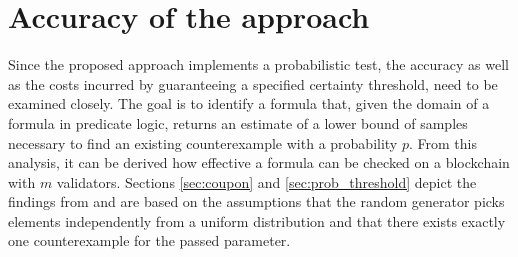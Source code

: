 \section{Accuracy of the approach}\label{sec:accuracy}
Since the proposed approach implements a probabilistic test, the accuracy as well as the costs incurred by guaranteeing a specified certainty threshold, need to be examined closely. The goal is to identify a formula that, given the domain of a formula in predicate logic, returns an estimate of a lower bound of samples necessary to find an existing counterexample with a probability $p$. From this analysis, it can be derived how effective a formula can be checked on a blockchain with $m$ validators. Sections \ref{sec:coupon} and \ref{sec:prob_threshold} depict the findings from \cite{bernhardt_veigel_2020} and are based on the assumptions that the random generator picks elements independently from a uniform distribution and that there exists exactly one counterexample for the passed parameter.

